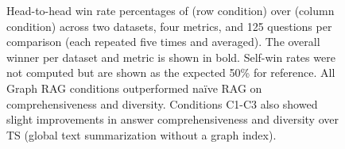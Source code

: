 \begin{figure}
\begin{minipage}{0.25\textwidth}
\end{minipage}%
\caption{Head-to-head win rate percentages of (row condition) over (column condition) across two datasets, four metrics, and 125 questions per comparison (each repeated five times and averaged). The overall winner per dataset and metric is shown in bold. Self-win rates were not computed but are shown as the expected 50\% for reference. All Graph RAG conditions outperformed na\"ive RAG on comprehensiveness and diversity. Conditions C1-C3 also showed slight improvements in answer comprehensiveness and diversity over TS (global text summarization without a graph index).}
\label{fig:relativemeasures}
\end{figure}